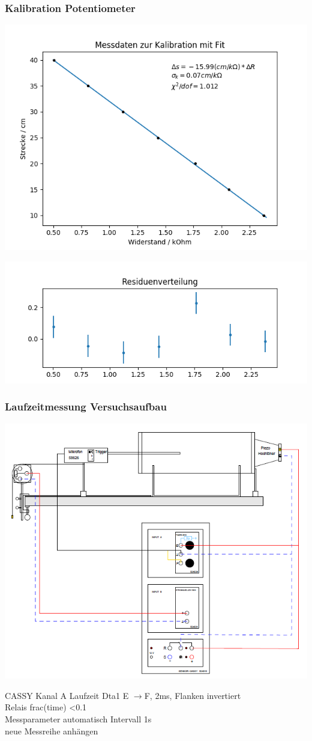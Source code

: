 \documentclass[12pt]{beamer}
\begin{document}
	\begin{frame}
		\frametitle{Kalibration Potentiometer}
		\begin{center}
			\includegraphics[width=0.6\linewidth]{kalibration_poti_fit}
			
			\includegraphics[width=0.6\linewidth]{residuen_kalibration}
		\end{center}
		
	\end{frame}

	
	\begin{frame}
		\frametitle{Laufzeitmessung \qquad Versuchsaufbau}
		\begin{center}
			\includegraphics[width=0.6\linewidth]{aufbau_laufzeitmessung}
		\end{center}
			CASSY Kanal A Laufzeit Dta1 E $\rightarrow$F, 2ms, Flanken invertiert \\
			Relais frac(time) \textless 0.1\\
			Messparameter  automatisch Intervall 1s \\
			neue Messreihe anhängen

	\end{frame}
\end{document}
